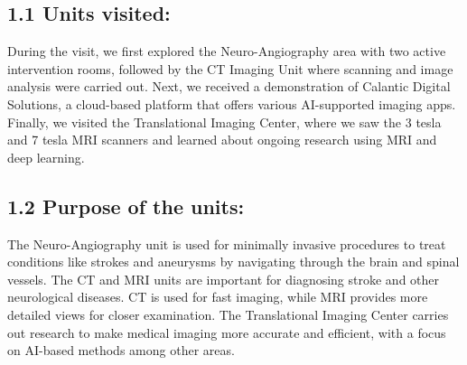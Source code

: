 \documentclass[a4paper, chapterprefix=true, numbers=noenddot]{scrreprt}
\begin{document}
\subsection*{1.1 Units visited:}
During the visit, we first explored the Neuro-Angiography area with two active intervention rooms, followed by the CT Imaging Unit where scanning and image analysis were carried out. Next, we received a demonstration of Calantic Digital Solutions, a cloud-based platform that offers various AI-supported imaging apps. Finally, we visited the Translational Imaging Center, where we saw the 3 tesla and 7 tesla MRI scanners and learned about ongoing research using MRI and deep learning. \par

\subsection*{1.2 Purpose of the units:} 
The Neuro-Angiography unit is used for minimally invasive procedures to treat conditions like strokes and aneurysms by navigating through the brain and spinal vessels. The CT and MRI units are important for diagnosing stroke and other neurological diseases. CT is used for fast imaging, while MRI provides more detailed views for closer examination. The Translational Imaging Center carries out research to make medical imaging more accurate and efficient, with a focus on AI-based methods among other areas. \par
\end{document}
